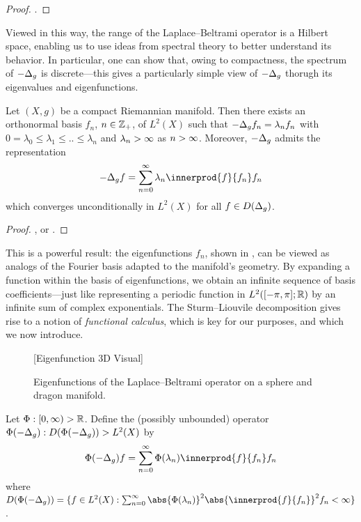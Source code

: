 \documentclass[11pt]{book}
\begin{document}
\begin{proof}
\textcite[Theorem 2.4]{strichartz83}.
\end{proof}

Viewed in this way, the range of the Laplace--Beltrami operator is a Hilbert space, enabling us to use ideas from spectral theory to better understand its behavior.
In particular, one can show that, owing to compactness, the spectrum of $-\Delta_g$ is discrete---this gives a particularly simple view of $-\Delta_g$ thorugh its eigenvalues and eigenfunctions.

\begin{result}
Let $(X,g)$ be a compact Riemannian manifold.
Then there exists an orthonormal basis $f_n$, $n\in\mathbb{Z}_+$, of $L^2(X)$ such that $-\Delta_g f_n = \lambda_n f_n$ with $0 = \lambda_0 \leq \lambda_1 \leq .. \leq \lambda_n$ and $\lambda_n\-> \infty$ as $n\->\infty$.
Moreover, $-\Delta_g$ admits the representation
\[
-\lap_g f = \sum_{n=0}^\infty \lambda_n \innerprod{f}{f_n} f_n
\]
which converges unconditionally in $L^2(X)$ for all $f \in D(\Delta_g)$.
\end{result}

\begin{proof}
\textcite[139]{chavel84}, or \textcite[Theorem 44]{canzani13}.
\end{proof}

This is a powerful result: the eigenfunctions $f_n$, shown in , can be viewed as analogs of the Fourier basis adapted to the manifold's geometry.
By expanding a function within the basis of eigenfunctions, we obtain an infinite sequence of basis coefficients---just like representing a periodic function in $L^2([-\pi,\pi];\mathbb{R})$ by an infinite sum of complex exponentials.
The Sturm--Liouvile decomposition gives rise to a notion of \emph{functional calculus}, which is key for our purposes, and which we now introduce.


\begin{figure}
\vspace*{10ex}
[Eigenfunction 3D Visual]
\vspace*{10ex}
\caption{Eigenfunctions of the Laplace--Beltrami operator on a sphere and dragon manifold.}
\label{fig:eig-s2-dr}
\end{figure}

\begin{definition}
Let $\Phi : [0,\infty) \-> \mathbb{R}$. 
Define the (possibly unbounded) operator $\Phi(-\Delta_g) : D(\Phi(-\Delta_g)) \-> L^2(X)$ by
\[
\Phi(-\lap_g) f = \sum_{n=0}^\infty \Phi(\lambda_n) \innerprod{f}{f_n} f_n
\]
where $D(\Phi(-\lap_g)) = \{f \in L^2(X) : \sum_{n=0}^\infty \abs{\Phi(\lambda_n)}^2 \abs{\innerprod{f}{f_n}}^2 f_n < \infty\}$.
\end{definition}
\end{document}

